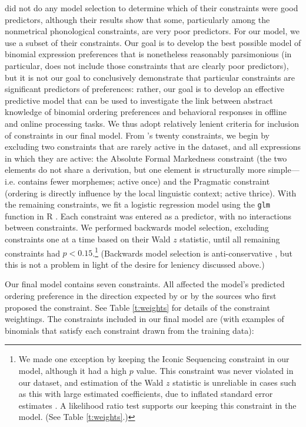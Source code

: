\documentclass[authoryear]{elsarticle}
\begin{document}
\citeauthor{Benor:2006gv} did not do any model selection to determine which of their constraints were good predictors, although their results show that some, particularly among the nonmetrical phonological constraints, are very poor predictors. For our model, we use a subset of their constraints. Our goal is to develop the best possible model of binomial expression preferences that is nonetheless reasonably parsimonious (in particular, does not include those constraints that are clearly poor predictors), but it is not our goal to conclusively demonstrate that particular constraints are significant predictors of preferences: rather, our goal is to develop an effective predictive model that can be used to investigate the link between abstract knowledge of binomial ordering preferences and behavioral responses in offline and online processing tasks. We thus adopt relatively lenient criteria for inclusion of constraints in our final model. From \citeauthor{Benor:2006gv}'s twenty constraints, we begin by excluding two constraints that are rarely active in the dataset, and all expressions in which they are active: the Absolute Formal Markedness constraint (the two elements do not share a derivation, but one element is structurally more simple---i.e. contains fewer morphemes; active once) and the Pragmatic constraint (ordering is directly influence by the local linguistic context; active thrice). With the remaining constraints, we fit a logistic regression model using the {\tt glm} function in R \citep{RCoreTeam:2014wf}. Each constraint was entered as a predictor, with no interactions between constraints. We performed backwards model selection, excluding constraints one at a time based on their Wald $z$ statistic, until all remaining constraints had $p < 0.15$.\footnote{\label{waldz}We made one exception by keeping the Iconic Sequencing constraint in our model, although it had a high $p$ value. This constraint was never violated in our dataset, and estimation of the Wald $z$ statistic is unreliable in cases such as this with large estimated coefficients, due to inflated standard error estimates \citep{Agresti:2002vi,Menard:2002tc}. A likelihood ratio test supports our keeping this constraint in the model. (See Table \ref{t:weights}.)} (Backwards model selection is anti-conservative \citep{Harrell:2001jr}, but this is not a problem in light of the desire for leniency discussed above.)

Our final model contains seven constraints. All affected the model's predicted ordering preference in the direction expected by \citeauthor{Benor:2006gv} or by the sources who first proposed the constraint. See Table \ref{t:weights} for details of the constraint weightings.
The constraints included in our final model are (with examples of binomials that satisfy each constraint drawn from the training data):
\end{document}
